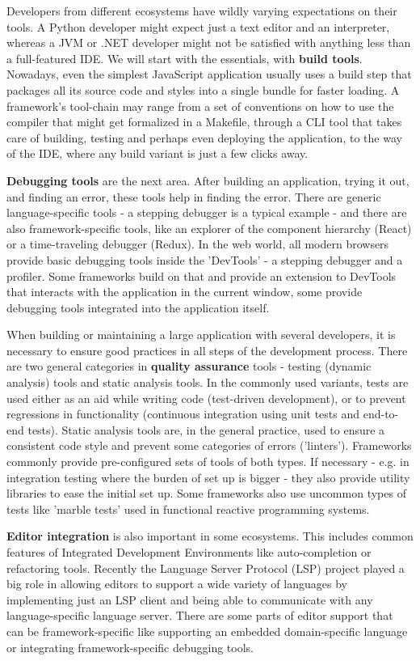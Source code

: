 \documentclass[english,odsaz]{fitthesis}
\begin{document}
Developers from different ecosystems have wildly varying expectations on their
tools. A Python developer might expect just a text editor and an interpreter,
whereas a JVM or .NET developer might not be satisfied with anything less than a
full-featured IDE. We will start with the essentials, with \textbf{build
tools}. Nowadays, even the simplest JavaScript application usually uses a build
step that packages all its source code and styles into a single bundle for
faster loading. A framework's tool-chain may range from a set of conventions on
how to use the compiler that might get formalized in a Makefile, through a CLI
tool that takes care of building, testing and perhaps even deploying the
application, to the way of the IDE, where any build variant is just a few clicks
away.

\textbf{Debugging tools} are the next area. After building an application, trying it out,
and finding an error, these tools help in finding the error. There are generic
language-specific tools - a stepping debugger is a typical example - and there
are also framework-specific tools, like an explorer of the component hierarchy
(React) or a time-traveling debugger (Redux). In the web world, all modern
browsers provide basic debugging tools inside the 'DevTools' - a stepping
debugger and a profiler. Some frameworks build on that and provide an extension
to DevTools that interacts with the application in the current window, some
provide debugging tools integrated into the application itself.

When building or maintaining a large application with several developers, it is
necessary to ensure good practices in all steps of the development
process. There are two general categories in \textbf{quality assurance} tools - testing
(dynamic analysis) tools and static analysis tools. In the commonly used
variants, tests are used either as an aid while writing code (test-driven
development), or to prevent regressions in functionality (continuous integration
using unit tests and end-to-end tests). Static analysis tools are, in the
general practice, used to ensure a consistent code style and prevent some
categories of errors ('linters'). Frameworks commonly provide pre-configured
sets of tools of both types. If necessary - e.g. in integration testing where
the burden of set up is bigger - they also provide utility libraries to ease the
initial set up. Some frameworks also use uncommon types of tests like 'marble
tests' used in functional reactive programming systems.

\textbf{Editor integration} is also important in some ecosystems. This includes common
features of Integrated Development Environments like auto-completion or
refactoring tools. Recently the Language Server Protocol (LSP) \cite{lsp} project
played a big role in allowing editors to support a wide variety of languages by
implementing just an LSP client and being able to communicate with any
language-specific language server. There are some parts of editor support that
can be framework-specific like supporting an embedded domain-specific language
or integrating framework-specific debugging tools.
\end{document}
